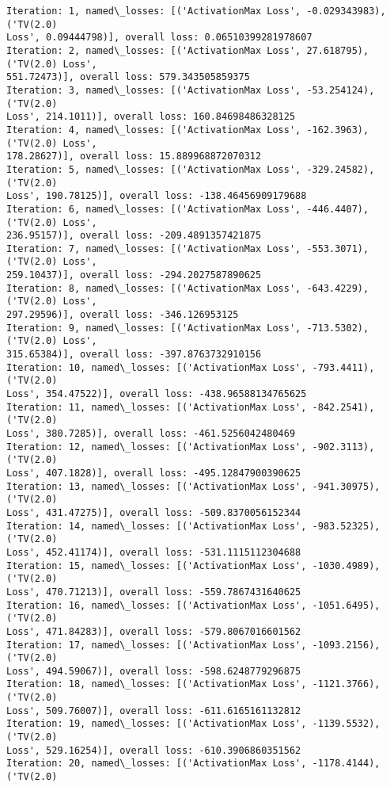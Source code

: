 \documentclass[10pt]{article}
\begin{document}
    \begin{Verbatim}[commandchars=\\\{\}]
Iteration: 1, named\_losses: [('ActivationMax Loss', -0.029343983), ('TV(2.0)
Loss', 0.09444798)], overall loss: 0.06510399281978607
Iteration: 2, named\_losses: [('ActivationMax Loss', 27.618795), ('TV(2.0) Loss',
551.72473)], overall loss: 579.343505859375
Iteration: 3, named\_losses: [('ActivationMax Loss', -53.254124), ('TV(2.0)
Loss', 214.1011)], overall loss: 160.84698486328125
Iteration: 4, named\_losses: [('ActivationMax Loss', -162.3963), ('TV(2.0) Loss',
178.28627)], overall loss: 15.889968872070312
Iteration: 5, named\_losses: [('ActivationMax Loss', -329.24582), ('TV(2.0)
Loss', 190.78125)], overall loss: -138.46456909179688
Iteration: 6, named\_losses: [('ActivationMax Loss', -446.4407), ('TV(2.0) Loss',
236.95157)], overall loss: -209.4891357421875
Iteration: 7, named\_losses: [('ActivationMax Loss', -553.3071), ('TV(2.0) Loss',
259.10437)], overall loss: -294.2027587890625
Iteration: 8, named\_losses: [('ActivationMax Loss', -643.4229), ('TV(2.0) Loss',
297.29596)], overall loss: -346.126953125
Iteration: 9, named\_losses: [('ActivationMax Loss', -713.5302), ('TV(2.0) Loss',
315.65384)], overall loss: -397.8763732910156
Iteration: 10, named\_losses: [('ActivationMax Loss', -793.4411), ('TV(2.0)
Loss', 354.47522)], overall loss: -438.96588134765625
Iteration: 11, named\_losses: [('ActivationMax Loss', -842.2541), ('TV(2.0)
Loss', 380.7285)], overall loss: -461.5256042480469
Iteration: 12, named\_losses: [('ActivationMax Loss', -902.3113), ('TV(2.0)
Loss', 407.1828)], overall loss: -495.12847900390625
Iteration: 13, named\_losses: [('ActivationMax Loss', -941.30975), ('TV(2.0)
Loss', 431.47275)], overall loss: -509.8370056152344
Iteration: 14, named\_losses: [('ActivationMax Loss', -983.52325), ('TV(2.0)
Loss', 452.41174)], overall loss: -531.1115112304688
Iteration: 15, named\_losses: [('ActivationMax Loss', -1030.4989), ('TV(2.0)
Loss', 470.71213)], overall loss: -559.7867431640625
Iteration: 16, named\_losses: [('ActivationMax Loss', -1051.6495), ('TV(2.0)
Loss', 471.84283)], overall loss: -579.8067016601562
Iteration: 17, named\_losses: [('ActivationMax Loss', -1093.2156), ('TV(2.0)
Loss', 494.59067)], overall loss: -598.6248779296875
Iteration: 18, named\_losses: [('ActivationMax Loss', -1121.3766), ('TV(2.0)
Loss', 509.76007)], overall loss: -611.6165161132812
Iteration: 19, named\_losses: [('ActivationMax Loss', -1139.5532), ('TV(2.0)
Loss', 529.16254)], overall loss: -610.3906860351562
Iteration: 20, named\_losses: [('ActivationMax Loss', -1178.4144), ('TV(2.0)

\end{Verbatim}
\end{document}
